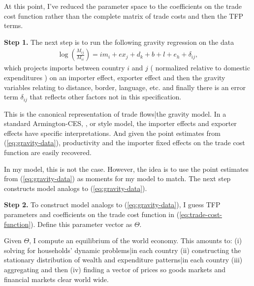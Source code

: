 \documentclass[12pt,pdftex]{article}
\begin{document}
\begin{onehalfspacing}
At this point, I've reduced the parameter space to the  coefficients on the trade cost function rather than the complete matrix of trade costs and then the TFP terms.

\textbf{Step 1.} The next step is to run the following gravity regression on the data
\begin{align}
\log \left( {\frac{M_{ij}}{M_{ii}}} \right) = {im_{i}} + {ex_{j}} + {d_{k}} + {b} + {l} + {e_{h}} + \delta_{ij},
\label{eq:gravity-data}
\end{align}
which projects imports between country $i$ and $j$ ( normalized relative to domestic expenditures ) on an importer effect, exporter effect and then the gravity variables relating to distance, border, language, etc. and finally there is an error term $\delta_{ij}$ that reflects other factors not in this specification.

This is the canonical representation of trade flows|the gravity model. In a standard Armington-CES, \citet{eaton2002technology}, or \citet{melitz2003impact} style model, the importer effects and exporter effects have specific interpretations. And given the point estimates from (\ref{eq:gravity-data}), productivity and the importer fixed effects on the trade cost function are easily recovered.

In my model, this is not the case. However, the idea is to use the point estimates from (\ref{eq:gravity-data}) as moments for my model to match. The next step constructs model analogs to (\ref{eq:gravity-data}).
%

\textbf{Step 2.} To construct model analogs to (\ref{eq:gravity-data}), I guess TFP parameters and coefficients on the trade cost function in (\ref{eq:trade-cost-function}). Define this parameter vector as $\Theta$.

Given $\Theta$, I compute an equilibrium of the world economy. This amounts to: (i) solving for households' dynamic problems|in each country (ii) constructing the stationary distribution of wealth and expenditure patterns|in each country (iii) aggregating and then (iv) finding a vector of prices so goods markets and financial markets clear world wide.


\end{onehalfspacing}
\end{document}
